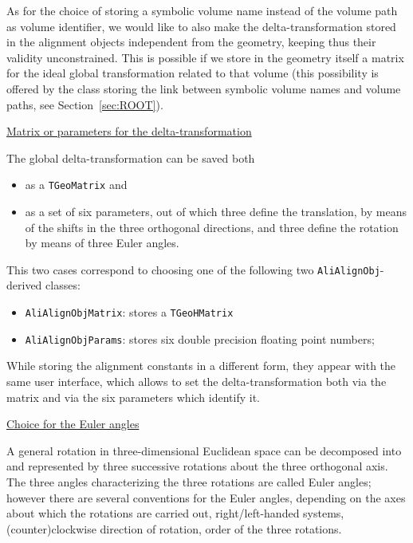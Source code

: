 \documentclass[12pt,a4paper,twoside]{article}
\begin{document}
{As for the choice of storing a symbolic volume name instead of the
volume path as volume identifier, we would like to also make the
delta-transformation stored in the alignment objects
independent from the geometry, keeping thus their validity
unconstrained. This is possible if we store in the geometry itself a
matrix for the ideal global transformation related to that volume
(this possibility is offered by the class storing the link between
symbolic volume names and volume paths, see Section~\ref{sec:ROOT}).


\underline{Matrix or parameters for the delta-transformation}

The global delta-transformation can be saved both
\begin{itemize}
\item as a \lstinline!TGeoMatrix! and
\item as a set of six parameters, out of which three define the
  translation, by means of the shifts in
  the three orthogonal directions, and three define the rotation
  by means of three Euler angles.
\end{itemize}
This two cases correspond to choosing one of the following two
\lstinline{AliAlignObj}- derived classes:
\begin{itemize}
  \item \lstinline!AliAlignObjMatrix!: stores a \lstinline!TGeoHMatrix!
  \item \lstinline!AliAlignObjParams!: stores six double precision floating
  point numbers;
\end{itemize}
While storing the alignment constants in a different form, they appear
with the same user interface, which allows to set the
delta-transformation both via the matrix and via the six parameters
which identify it.


\underline{Choice for the Euler angles}

A general rotation in three-dimensional Euclidean space can be
decomposed into and represented by three successive rotations  about
the three orthogonal axis. The three angles characterizing the three
rotations are called Euler angles; however there are several
conventions for the Euler angles, depending on the axes
about which the rotations are carried out, right/left-handed systems,
(counter)clockwise direction of rotation, order of the three rotations.

}
\end{document}
